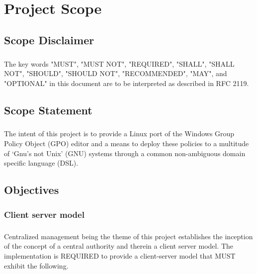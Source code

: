 \chapter{Project Scope}
		\section{Scope Disclaimer}
			\paragraph{}
				\vspace{1cm}
				The key words "MUST", "MUST NOT", "REQUIRED", "SHALL", "SHALL NOT", "SHOULD", "SHOULD NOT", "RECOMMENDED",  "MAY", and
	      		"OPTIONAL" in this document are to be interpreted as described in RFC 2119.
				\newline

		\section{Scope Statement}
			\paragraph{}
				\vspace{1cm}
				The intent of this project is to provide a Linux port of the Windows Group Policy Object (GPO) editor and a means 
				to deploy these policies to a multitude of ‘Gnu’s not Unix’ (GNU) systems through a common non-ambiguous domain specific 
				language (DSL). 
				\newline

		\section{Objectives}
			\subsection{Client server model}
				\vspace{1cm}
				\paragraph{}
				Centralized management being the theme of this project establishes the inception of the concept of a central
		    	authority and therein a client server model.  The implementation is REQUIRED to provide a client-server model 
				that MUST exhibit the following.

